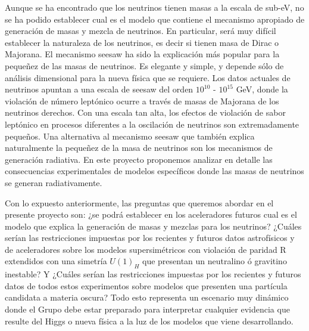 \begin{ideas}
 Aunque se ha encontrado que los neutrinos tienen masas a la escala de
sub-eV, no se ha podido establecer cual es el modelo que contiene
el mecanismo apropiado de generación de masas y mezcla de neutrinos.
En particular, será muy difícil establecer la naturaleza de los
neutrinos, es decir si tienen masa de Dirac o Majorana. El mecanismo seesaw %
ha sido la
explicación más popular para la pequeñez de las masas de neutrinos. Es
elegante y simple, y depende sólo de análisis dimensional para la
nueva física que se requiere. Los datos actuales de neutrinos
apuntan a una escala de seesaw del orden $10^{10}$ - $10^{15}$ GeV,
donde la violación de número leptónico ocurre a través de masas de
Majorana de los neutrinos derechos. Con una escala tan alta, los
efectos de violación de sabor leptónico en procesos diferentes a la
oscilación de neutrinos son extremadamente pequeños. Una alternativa al mecanismo seesaw que también explica naturalmente
la pequeñez de la masa de neutrinos son los mecanismos de generación
radiativa.
En este proyecto proponemos analizar en detalle las consecuencias
experimentales de modelos específicos donde las masas de
neutrinos se generan radiativamente.

Con lo expuesto anteriormente, las preguntas que queremos abordar en el presente proyecto son: 
¿se podrá establecer en los aceleradores futuros cual es el modelo que
explica la generación de masas y mezclas para los neutrinos? ¿Cuáles serían las restricciones 
impuestas por los recientes y futuros datos astrofísicos y de aceleradores sobre los modelos supersimétricos con violación de paridad R extendidos con una simetría $U(1)_H$ que presentan un neutralino ó gravitino inestable? Y ¿Cuáles serían las restricciones impuestas por los recientes y futuros datos de todos estos experimentos sobre  modelos que presenten una partícula candidata a materia oscura?
Todo esto representa un escenario muy dinámico donde el Grupo debe estar preparado para interpretar cualquier evidencia que resulte del Higgs o nueva física a la luz de los modelos que viene desarrollando.




\end{ideas}
